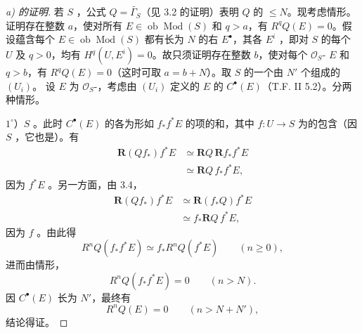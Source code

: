 \begin{proof}[a) 的证明]
若 $S$ ，公式 $Q=\widetilde{\Gamma_S}$（见 3.2 的证明）表明 $Q$ 的 $\leq N$。现考虑情形。证明存在整数 $a$，使对所有 $E\in\operatorname{ob}\operatorname{Mod}(S)$ 和 $q>a$，有 $R^qQ(E)=0$。假设蕴含每个 $E\in\operatorname{ob}\operatorname{Mod}(S)$ 都有长为 $N$ 的右 $E^\bullet$，其各 $E^i$ ，即对 $S$ 的每个 $U$ 及 $q>0$，均有 $H^q(U,E^i)=0$。故只须证明存在整数 $b$，使对每个 $\mathcal O_S$- $E$ 和 $q>b$，有 $R^qQ(E)=0$（这时可取 $a=b+N$）。取 $S$ 的一个由 $N'$ 个组成的 $(U_i)$。
设 $E$ 为 $\mathcal O_S$-，考虑由 $(U_i)$ 定义的 $E$ 的 $C^\bullet(E)$（T.F. II 5.2）。分两种情形。

$1^\circ$）$S$ 。此时 $C^\bullet(E)$ 的各为形如 $f_*f^*E$ 的项的和，其中 $f:U\to S$ 为的包含（因 $S$ ，它也是）。有
\[
\begin{aligned}
\mathbf R(Qf_*)f^*E&\simeq\mathbf RQ\,\mathbf Rf_*f^*E\\
&\simeq\mathbf RQ\,f_*f^*E,
\end{aligned}
\]
因为 $f^*E$ 。另一方面，由 3.4，
\[
\begin{aligned}
\mathbf R(Qf_*)f^*E&\simeq\mathbf R(f_*Q)f^*E\\
&\simeq f_*\mathbf RQ\,f^*E,
\end{aligned}
\]
因为 $f$ 。由此得
\[
R^nQ(f_*f^*E)\simeq f_*R^nQ(f^*E)\qquad(n\geq0),
\]
进而由情形，
\[
R^nQ(f_*f^*E)=0\qquad(n>N).
\]
因 $C^\bullet(E)$ 长为 $N'$，最终有
\[
R^nQ(E)=0\qquad(n>N+N'),
\]
结论得证。


\end{proof}

